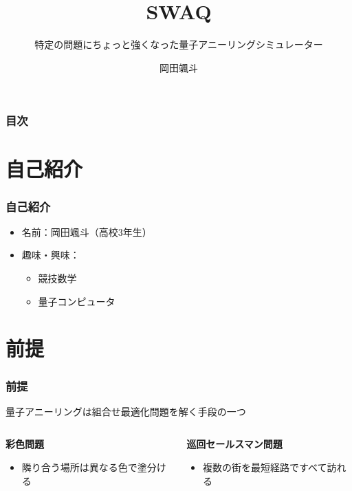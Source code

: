 \title[Swaq]{\color{black} \LARGE SWAQ}
\subtitle[ちょっと強いQAS]{特定の問題にちょっと強くなった量子アニーリングシミュレーター}
\author[岡田颯斗]{岡田颯斗}
\date{}
\begin{frame}{}
\titlepage
\end{frame}
\large

\begin{frame}
  \frametitle{目次}
  \tableofcontents
\end{frame}


\section{自己紹介}
\begin{frame}
  \frametitle{自己紹介}
  \begin{itemize}
      \item 名前：岡田颯斗（高校3年生）
      \item 趣味・興味：
      \begin{itemize}
          \item 競技数学
          \item 量子コンピュータ
      \end{itemize}
  \end{itemize}
\end{frame}

\section{前提}
\begin{frame}
  \frametitle{前提}

  {\Large  量子アニーリングは組合せ最適化問題を解く手段の一つ}
  \vspace{5mm}

  \begin{columns}
    \begin{column}{0.45\textwidth}
      \textbf{彩色問題}
      \begin{itemize}
          \item 隣り合う場所は異なる色で塗分ける
      \end{itemize}
    \end{column}

    \begin{column}{0.45\textwidth}
      \textbf{巡回セールスマン問題}
      \begin{itemize}
          \item 複数の街を最短経路ですべて訪れる
      \end{itemize}
    \end{column}
  \end{columns}
  \vspace{5mm}
\end{frame}

